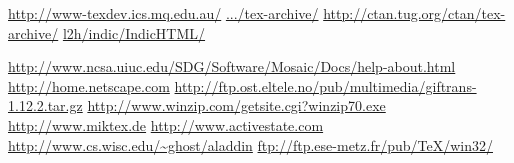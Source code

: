 \begin{htmlonly}
%
\internal{}%
%
%
%
%
%
%

\newcommand{\texdev}[1]{\htmladdnormallink
 {\texdevURL/#1}{\texdevURL/#1}}
\newcommand{\ctan}{http://ctan.tug.org/ctan}
\newcommand{\ctanTUG}{\htmladdnormallinkfoot
 {TUG's searchable CTAN site}{\ctan}}
\newcommand{\ctanURL}[1]{\htmladdnormallink
 {CTAN:\texttt{.../#1}}{\ctan/tex-archive/#1}}
\newcommand{\ctanURLbr}[1]{\htmladdnormallink
 {CTAN:\texttt{.../#1}}{\ctan/tex-archive/#1}}
\newcommand{\ctanTUGurl}[2]{\ctanURL{#2}}
\newcommand{\indichtml}{l2h/indic/IndicHTML/}

\end{htmlonly}

\newcommand{\TUGurl}{\htmladdnormallink{TUG}{\htmlurl{http://www.tug.org}}}

\newcommand{\texdevURL}{http://www-texdev.ics.mq.edu.au/}
\newcommand{\Unicode}{\htmladdnormallinkfoot
 {Unicode}{http://www.unicode.org/}}
\newcommand{\IndicHTML}{\htmladdnormallinkfoot
 {Indic\TeX/HTML}{\texdevURL{\indichtml}}}

\usepackage{array}

\newcommand{\Cs}[1]{{\upshape`\,\texttt{-#1}\,'}}
\newcommand{\Ve}[1]{\index{#1@\texttt{#1}}{\upshape`\,\texttt{#1}\,'}}
\newcommand{\Lc}[1]{{\upshape\ttfamily\char92#1}}
\newcommand{\Tc}[1]{{\upshape\ttfamily\char92#1}}

\newcommand{\ctanTUG}[1]{TUG's searchable CTAN site\footnote{\ctanTUGurl}}
\newcommand{\ctanURL}{CTAN: \penalty-200\ctanurl}
\newcommand{\ctanURLbr}{CTAN: \newline\ctanurl}
\urldef\texdev\url{http://www-texdev.ics.mq.edu.au/}
\urldef\ctanurl\url{.../tex-archive/}
\urldef\ctanTUGurl\url{http://ctan.tug.org/ctan/tex-archive/}
\urldef\indichtml\url{l2h/indic/IndicHTML/}

\urldef\MosaicDocs\url{http://www.ncsa.uiuc.edu/SDG/Software/Mosaic/Docs/help-about.html}
\urldef\NetscapeHome\url{http://home.netscape.com}
\urldef\giftransURL\url{http://ftp.ost.eltele.no/pub/multimedia/giftrans-1.12.2.tar.gz}
\urldef\WinZipURL\url{http://www.winzip.com/getsite.cgi?winzip70.exe}
\urldef\MikTeXURL\url{http://www.miktex.de}
\urldef\ActiveStateURL\url{http://www.activestate.com}
\urldef\GhostScriptURL\url{http://www.cs.wisc.edu/~ghost/aladdin}
\urldef\NetpbmWinURL\url{ftp://ftp.ese-metz.fr/pub/TeX/win32/}

\begin{htmlonly}
\newcommand{\MosaicDocs}{\url{http://www.ncsa.uiuc.edu/SDG/Software/Mosaic/Docs/help-about.html}}
\newcommand{\NetscapeHome}{\url{http://home.netscape.com}}
\newcommand{\giftransURL}{\url{http://ftp.ost.eltele.no/pub/multimedia/giftrans-1.12.2.tar.gz}}
\newcommand{\WinZipURL}{\url{http://www.winzip.com/getsite.cgi?winzip70.exe}}
\newcommand{\MikTeXURL}{\url{http://www.miktex.de}}
\newcommand{\ActiveStateURL}{\url{http://www.activestate.com}}
\newcommand{\GhostScriptURL}{\url{http://www.cs.wisc.edu/~ghost/aladdin}}
\newcommand{\NetpbmWinURL}{\url{ftp://ftp.ese-metz.fr/pub/TeX/win32/}}
\end{htmlonly}




